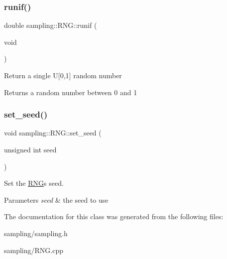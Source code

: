 \subsubsection{\texorpdfstring{runif()}{runif()}}
{\footnotesize\ttfamily double sampling\+::\+R\+N\+G\+::runif (\begin{DoxyParamCaption}\item[{void}]{ }\end{DoxyParamCaption})}

Return a single U\mbox{[}0,1\mbox{]} random number \begin{DoxyReturn}{Returns}
a random number between 0 and 1 
\end{DoxyReturn}
\mbox{\label{classsampling_1_1RNG_ad739124235d7d9bbe31f86d37f2fb9e5}} 
\subsubsection{\texorpdfstring{set\+\_\+seed()}{set\_seed()}}
{\footnotesize\ttfamily void sampling\+::\+R\+N\+G\+::set\+\_\+seed (\begin{DoxyParamCaption}\item[{unsigned int}]{seed }\end{DoxyParamCaption})}

Set the \hyperlink{classsampling_1_1RNG}{R\+NG}\textquotesingle{}s seed. 
\begin{DoxyParams}{Parameters}
{\em seed} & the seed to use \\
\hline
\end{DoxyParams}


The documentation for this class was generated from the following files\+:\begin{DoxyCompactItemize}
\item 
sampling/sampling.\+h\item 
sampling/R\+N\+G.\+cpp\end{DoxyCompactItemize}
